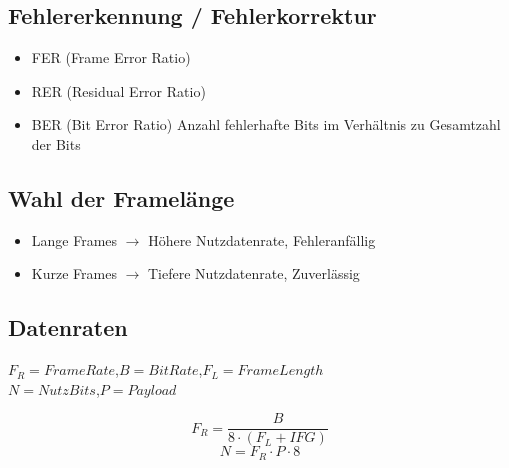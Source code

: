 \subsection{Fehlererkennung / Fehlerkorrektur}{
    \begin{itemize}[noitemsep]
        \item FER (Frame Error Ratio)
        \item RER (Residual Error Ratio)
        \item BER (Bit Error Ratio) Anzahl fehlerhafte Bits im Verhältnis zu Gesamtzahl der Bits
    \end{itemize}
}



\subsection{Wahl der Framelänge}{
    \begin{itemize}[noitemsep]
        \item Lange Frames $\to$ Höhere Nutzdatenrate, Fehleranfällig
        \item Kurze Frames $\to$ Tiefere Nutzdatenrate, Zuverlässig
    \end{itemize}
}
\subsection{Datenraten}{
    $F_R = FrameRate$,$B=BitRate$,$F_L = FrameLength$ \\
    $ N = NutzBits $,$P = Payload$

    $$ F_R = \frac{B}{8 \cdot (F_L + IFG)} $$
    $$ N = F_R \cdot P \cdot 8 $$
}

